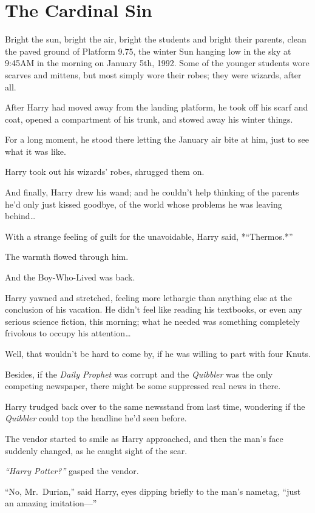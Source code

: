\chapter{The Cardinal Sin}\label{the-cardinal-sin}

Bright the sun, bright the air, bright the students and bright their
parents, clean the paved ground of Platform 9.75, the winter Sun hanging
low in the sky at 9:45AM in the morning on January 5th, 1992. Some of
the younger students wore scarves and mittens, but most simply wore
their robes; they were wizards, after all.

After Harry had moved away from the landing platform, he took off his
scarf and coat, opened a compartment of his trunk, and stowed away his
winter things.

For a long moment, he stood there letting the January air bite at him,
just to see what it was like.

Harry took out his wizards' robes, shrugged them on.

And finally, Harry drew his wand; and he couldn't help thinking of the
parents he'd only just kissed goodbye, of the world whose problems he
was leaving behind\ldots{}

With a strange feeling of guilt for the unavoidable, Harry said,
*``Thermos.*''

The warmth flowed through him.

And the Boy-Who-Lived was back.

Harry yawned and stretched, feeling more lethargic than anything else at
the conclusion of his vacation. He didn't feel like reading his
textbooks, or even any serious science fiction, this morning; what he
needed was something completely frivolous to occupy his
attention\ldots{}

Well, that wouldn't be hard to come by, if he was willing to part with
four Knuts.

Besides, if the \emph{Daily Prophet} was corrupt and the \emph{Quibbler}
was the only competing newspaper, there might be some suppressed real
news in there.

Harry trudged back over to the same newsstand from last time, wondering
if the \emph{Quibbler} could top the headline he'd seen before.

The vendor started to smile as Harry approached, and then the man's face
suddenly changed, as he caught sight of the scar.

\emph{``Harry Potter?''} gasped the vendor.

``No, Mr.~Durian,'' said Harry, eyes dipping briefly to the man's
nametag, ``just an amazing imitation---''

